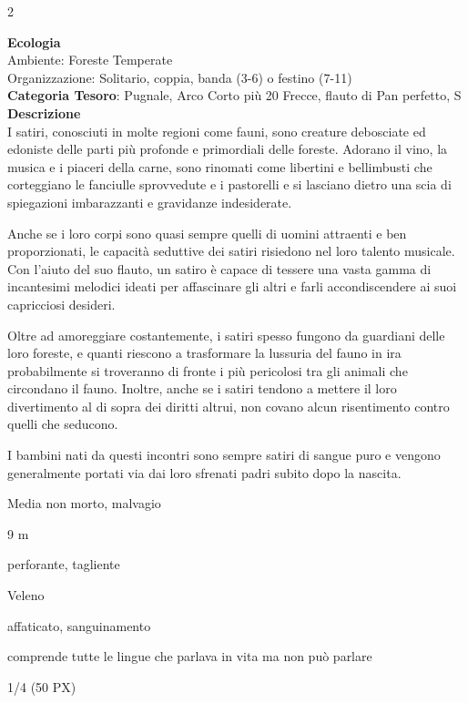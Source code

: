 \begin{multicols}{2}
{\textbf{Ecologia}\\
Ambiente: Foreste Temperate\\
Organizzazione: Solitario, coppia, banda (3-6) o festino (7-11)\\
\textbf{Categoria Tesoro}: Pugnale, Arco Corto più 20 Frecce, flauto di Pan perfetto, S\\
\textbf{Descrizione}\\
I satiri, conosciuti in molte regioni come fauni, sono creature debosciate ed edoniste delle parti più profonde e primordiali delle foreste. Adorano il vino, la musica e i piaceri della carne, sono rinomati come libertini e bellimbusti che corteggiano le fanciulle sprovvedute e i pastorelli e si lasciano dietro una scia di spiegazioni imbarazzanti e gravidanze indesiderate.

Anche se i loro corpi sono quasi sempre quelli di uomini attraenti e ben proporzionati, le capacità seduttive dei satiri risiedono nel loro talento musicale. Con l'aiuto del suo flauto, un satiro è capace di tessere una vasta gamma di incantesimi melodici ideati per affascinare gli altri e farli accondiscendere ai suoi capricciosi desideri.

Oltre ad amoreggiare costantemente, i satiri spesso fungono da guardiani delle loro foreste, e quanti riescono a trasformare la lussuria del fauno in ira probabilmente si troveranno di fronte i più pericolosi tra gli animali che circondano il fauno. Inoltre, anche se i satiri tendono a mettere il loro divertimento al di sopra dei diritti altrui, non covano alcun risentimento contro quelli che seducono.

I bambini nati da questi incontri sono sempre satiri di sangue puro e vengono generalmente portati via dai loro sfrenati padri subito dopo la nascita.

\begin{description}[noitemsep, topsep=0pt, parsep=0pt, partopsep=0pt, itemsep=1pt, leftmargin=2.35cm,  labelwidth=2.2cm, itemindent=0cm, listparindent=0pt] %
\setlength{\baselineskip}{10pt}
\item[\textbf{Taglia/Tipo}] Media non morto, malvagio
\item[\textbf{Caratt.}] 
\item[\textbf{Punti Ferita}] 
\item[\textbf{Movimento}] 9 m
\item[\textbf{Tiri Salvez.}] 
\item[\textbf{Res. Danni}] perforante, tagliente
\item[\textbf{Imm. Danni}] Veleno
\item[\textbf{Immunità}] affaticato, sanguinamento
\item[\textbf{Sensi}] 
\item[\textbf{Linguaggi}] comprende tutte le lingue che parlava in vita ma non può parlare
\item[\textbf{Sfida}] 1/4 (50 PX)
\end{description}
\smallskip

}
\end{multicols}
